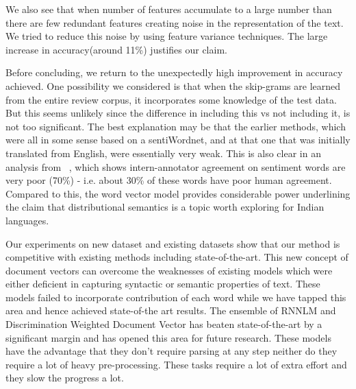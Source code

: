 \documentclass[11pt,a4paper]{article}
\begin{document}
We also see that when number of features accumulate to a large number than there are few redundant features creating noise in the representation of the text. We tried to reduce this noise by using feature variance techniques. The large increase in accuracy(around 11\%) justifies our claim.

Before concluding, we return to the unexpectedly high improvement in accuracy achieved. One possibility we considered is that when the skip-grams are learned from the entire review corpus, it incorporates some knowledge of the test data.  But this seems unlikely since the difference in including this vs not including it, is not too significant.  The best explanation may be that the earlier methods, which were all in some sense based on a sentiWordnet, and at that one that was initially translated from English, were essentially very weak.  This is also clear in an analysis from
~\cite{Bakliwal:12}, which shows intern-annotator agreement on sentiment words are very poor (70\%) - i.e. about 30\% of these words have poor human agreement. Compared to this, the word vector model  
provides considerable power underlining the claim that distributional semantics is a topic worth exploring for Indian languages.

Our experiments on new dataset and existing datasets show that our method is competitive with existing methods including state-of-the-art. This new concept of document vectors can overcome the weaknesses of existing models which were either deficient in capturing syntactic or semantic properties of text. These models failed to incorporate contribution of each word while we have tapped this area and hence achieved state-of-the art results. The ensemble of RNNLM and Discrimination Weighted Document Vector has beaten state-of-the-art by a significant margin and has opened this area for future research. These models have the advantage that they don't require parsing at any step neither do they require a lot of heavy pre-processing. These tasks require a lot of extra effort and they slow the progress a lot.
\end{document}
